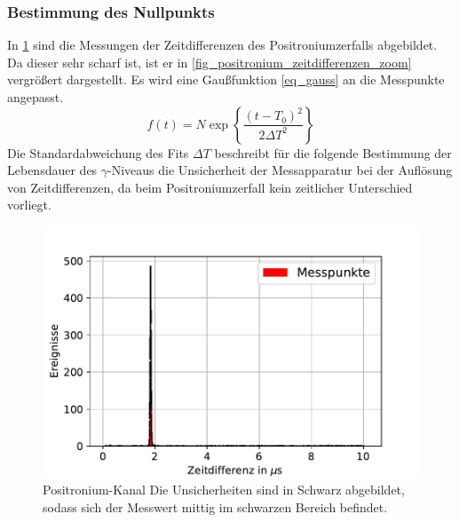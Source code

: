 \documentclass[
	a4paper,
	12pt,
	pagesize,
	ngerman
]{scrartcl}
\begin{document}
		\subsubsection{Bestimmung des Nullpunkts}
		In \cref{fig_positronium_zeitdifferenzen} sind die Messungen der Zeitdifferenzen des Positroniumzerfalls abgebildet.
		Da dieser sehr scharf ist, ist er in \cref{fig_positronium_zeitdifferenzen_zoom} vergrößert dargestellt.
		Es wird eine Gaußfunktion \ref{eq_gauss} an die Messpunkte angepasst.
		\begin{equation}
			\label{eq_gauss}
			 f(t) = N\exp\left\{{\frac{(t-T_0)^2}{2 \Delta T^2}}\right\}
		\end{equation}
		Die Standardabweichung des Fits $\Delta T$ beschreibt für die folgende Bestimmung der Lebensdauer des $\gamma$-Niveaus die Unsicherheit der Messapparatur bei der Auflösung von Zeitdifferenzen, da beim Positroniumzerfall kein zeitlicher Unterschied vorliegt. %

	\begin{figure}[H]
				\includegraphics[width= 0.9 \linewidth]{img/Positronium_Zeitdifferenz}
				\caption{
					Positronium-Kanal
				Die Unsicherheiten sind in Schwarz abgebildet, sodass sich der Messwert mittig im schwarzen Bereich befindet.
				}
				\label{fig_positronium_zeitdifferenzen}
		\end{figure}
\end{document}
